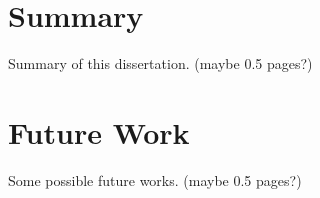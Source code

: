 \section{Summary}
Summary of this dissertation. (maybe 0.5 pages?)

\section{Future Work}
Some possible future works. (maybe 0.5 pages?)
